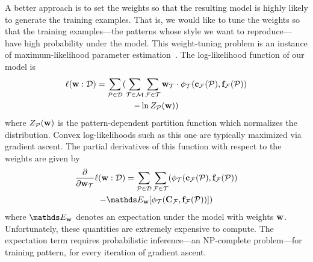 A better approach is to set the weights so that the resulting model is highly likely to generate the training examples. That is, we would like to tune the weights so that the training examples---the patterns whose style we want to reproduce---have high probability under the model. This weight-tuning problem is an instance of maximum-likelihood parameter estimation~\cite{PGMBook}. The log-likelihood function of our model is
\begin{multline*}
\ell(\mathbf{w} : \mathcal{D}) =
	\sum_{\mathcal{P} \in \mathcal{D}}
	(
		\sum_{\mathcal{T} \in \mathcal{M}}
			\sum_{\mathcal{F} \in \mathcal{T}}
				\mathbf{w}_{\mathcal{T}} \cdot \phi_{\mathcal{T}}(\mathbf{c_{\mathcal{F}}}(\mathcal{P}),\mathbf{f_{\mathcal{F}}}(\mathcal{P})) \\
		- \ln{Z_{\mathcal{P}}(\mathbf{w})}
	)
\end{multline*}
where $Z_{\mathcal{P}}(\mathbf{w})$ is the pattern-dependent partition function which normalizes the distribution. Convex log-likelihoods such as this one are typically maximized via gradient ascent. The partial derivatives of this function with respect to the weights are given by
\begin{multline*}
\frac{\partial}{\partial \weights_\template} \ell(\weights : \dataset) = 
	\sum_{\pattern \in \dataset}
		\sum_{\factor \in \template}
		(
			\stats{\template}{\variable{c_\factor}(\pattern)}{\variable{f_\factor}(\pattern)} \\
				- \expectation_\weights[\stats{\template}{\variable{C_\factor}}{\variable{f_\factor}(\pattern)}]
		)
\end{multline*}
where $\expectation_\weights$ denotes an expectation under the model with weights $\mathbf{w}$. Unfortunately, these quantities are extremely expensive to compute. The expectation term requires probabilistic inference---an NP-complete problem---for training pattern, for every iteration of gradient ascent.

